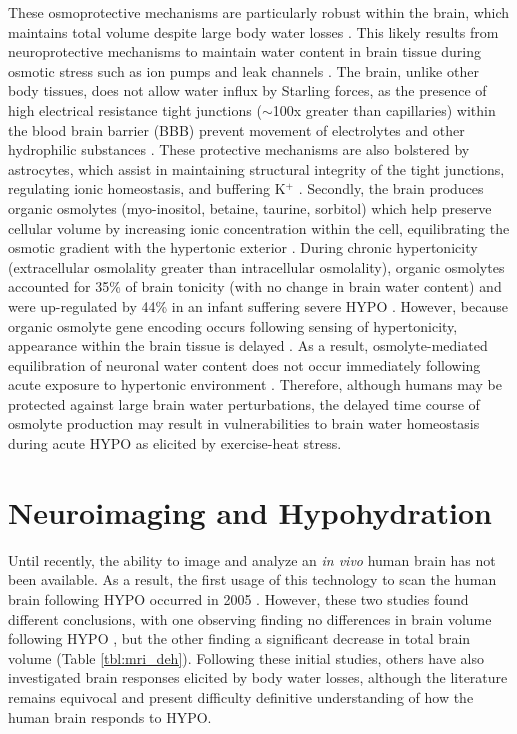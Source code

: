 These osmoprotective mechanisms are particularly robust within the brain, which maintains total volume despite large body water losses \cite{nose_distribution_1983,cipolla_cerebral_2009}. This likely results from neuroprotective mechanisms to maintain water content in brain tissue during osmotic stress such as ion pumps and leak channels \cite{cipolla_cerebral_2009,cserr_extracellular_1991}. The brain, unlike other body tissues, does not allow water influx by Starling forces, as the presence of high electrical resistance tight junctions (${\sim}$100x greater than capillaries) within the blood brain barrier (BBB) prevent movement of electrolytes and other hydrophilic substances \cite{kimelberg_water_2004,cipolla_cerebral_2009,ropper_hyperosmolar_2012,bain_cerebral_2015}. These protective mechanisms are also bolstered by astrocytes, which assist in maintaining structural integrity of the tight junctions, regulating ionic homeostasis, and buffering K${^+}$ \cite{cipolla_cerebral_2009}. Secondly, the brain produces organic osmolytes (myo-inositol, betaine, taurine, sorbitol) which help preserve cellular volume by increasing ionic concentration within the cell, equilibrating the osmotic gradient with the hypertonic exterior \cite{de_petris_cell_2001,weed_pressure_1919}. During chronic hypertonicity (extracellular osmolality greater than intracellular osmolality), organic osmolytes accounted for 35\% of brain tonicity (with no change in brain water content) \cite{lien_effects_1990} and were up-regulated by 44\% in an infant suffering severe HYPO \cite{lee_organic_1994}. However, because organic osmolyte gene encoding occurs following sensing of hypertonicity, appearance within the brain tissue is delayed \cite{de_petris_cell_2001, gullans_control_1993}. As a result, osmolyte-mediated equilibration of neuronal water content does not occur immediately following acute exposure to hypertonic environment \cite{ayus_effects_1996}. Therefore, although humans may be protected against large brain water perturbations, the delayed time course of osmolyte production may result in vulnerabilities to brain water homeostasis during acute HYPO as elicited by exercise-heat stress. 

\section{Neuroimaging and Hypohydration}
Until recently, the ability to image and analyze an \textit{in vivo} human brain has not been available. As a result, the first usage of this technology to scan the human brain following HYPO occurred in 2005 \cite{dickson_effects_2005, duning_dehydration_2005}. However, these two studies found different conclusions, with one observing finding no differences in brain volume following HYPO \cite{dickson_effects_2005}, but the other finding a significant decrease in total brain volume \cite{duning_dehydration_2005} (Table \ref{tbl:mri_deh}). Following these initial studies, others have also investigated brain responses elicited by body water losses, although the literature remains equivocal and present difficulty definitive understanding of how the human brain responds to HYPO. 

